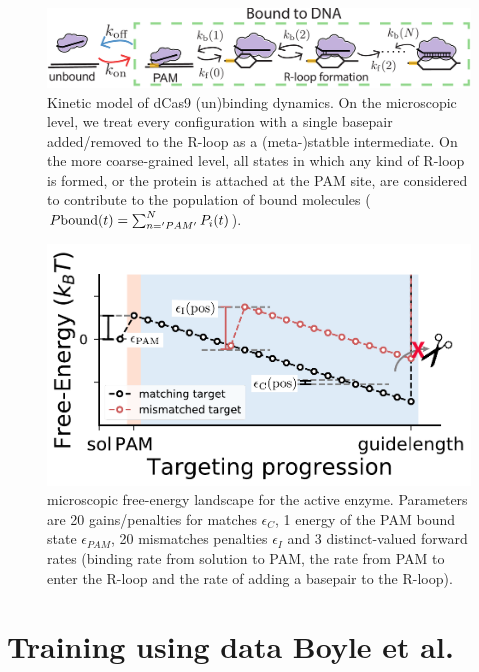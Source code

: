 \documentclass[a4paper,twoside]{revtex4-1}
\begin{document}
\begin{figure}[H]
	\centering
	\includegraphics[width=\textwidth]{dCas9_modelling}
	\caption{Kinetic model of dCas9 (un)binding dynamics. On the microscopic level, we treat every configuration with a single basepair added/removed to the R-loop as a (meta-)statble intermediate.  On the more coarse-grained level, all states in which any kind of R-loop is formed, or the protein is attached at the PAM site, are considered to contribute to the population of bound molecules ($P{\rm{bound}}(t) = \sum_{n='PAM'}^{N} P_i(t)$). }
	\label{dCas9_model}
\end{figure}


\begin{figure}[H]
	\centering
	\includegraphics[scale=0.75]{cartoon_energy_landscape_edit}
	\caption{microscopic free-energy landscape for the active enzyme. Parameters are 20 gains/penalties for matches $\epsilon_C$, 1 energy of the PAM bound state $\epsilon_{PAM}$, 20 mismatches penalties $\epsilon_I$ and 3 distinct-valued forward rates (binding rate from solution to PAM, the rate from PAM to enter the R-loop and the rate of adding a basepair to the R-loop).  }
	\label{free_energy_cartoon}
\end{figure}




\section*{Training using data Boyle et al.}
\end{document}
